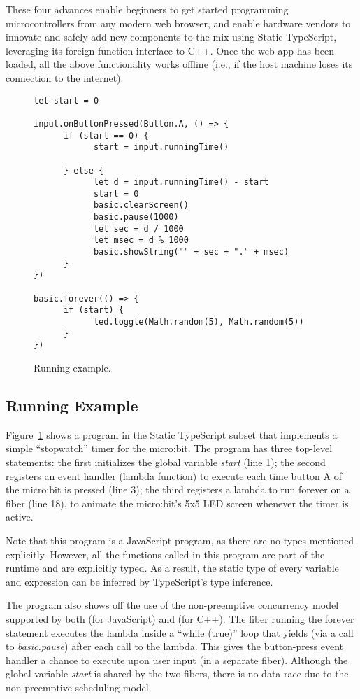 These four advances enable beginners to get started programming microcontrollers from any modern web browser, and enable
hardware vendors to innovate and safely add new components to the mix using Static TypeScript, leveraging its
foreign function interface to C++.
Once the web app has been loaded, all the above functionality works offline (i.e., if the host machine loses its connection
to the internet).

\begin{figure}
\begin{lstlisting}
let start = 0

input.onButtonPressed(Button.A, () => {
      if (start == 0) {
            start = input.runningTime()

      } else {
            let d = input.runningTime() - start
            start = 0
            basic.clearScreen()
            basic.pause(1000)
            let sec = d / 1000
            let msec = d % 1000
            basic.showString("" + sec + "." + msec)
      }
})

basic.forever(() => {
      if (start) {
            led.toggle(Math.random(5), Math.random(5))
      }
})
\end{lstlisting}
\caption{\label{fig:example}Running example.}
\end{figure}

\subsection{Running Example}

Figure~\ref{fig:example} shows a program in the Static
TypeScript subset that implements a simple ``stopwatch'' timer
for the micro:bit.
The program has three top-level statements:
the first initializes the global variable \emph{start} (line 1); the
second registers an event handler (lambda function) to execute
each time button A of the micro:bit is pressed (line 3); the
third registers a lambda to run forever on a fiber (line 18),
to animate the micro:bit's 5x5 LED screen whenever the timer is active. 

Note that this program is a JavaScript program, as there are no 
types mentioned explicitly. However, all the functions called in
this program are part of the runtime and are explicitly
typed.  As a result, the static type of every variable and expression
can be inferred by TypeScript's type inference.

The program also shows off the use of the non-preemptive concurrency
model supported by both \MC (for JavaScript) and \CO (for C++). 
The fiber running the forever statement executes the lambda inside a ``while (true)'' 
loop that yields (via a call to \emph{basic.pause}) after each call to the lambda.
This gives the button-press event handler a chance to execute
upon user input (in a separate fiber). Although the global variable \emph{start} is 
shared by the two fibers, there is no data race due to the non-preemptive 
scheduling model. 

